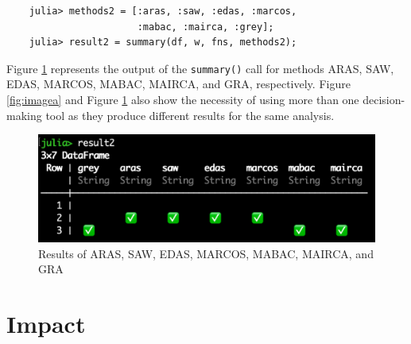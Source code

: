 \documentclass[preprint,review, 12pt, a4paper]{elsarticle}
\begin{document}
\begin{verbatim}
	julia> methods2 = [:aras, :saw, :edas, :marcos, 
	                   :mabac, :mairca, :grey];
	julia> result2 = summary(df, w, fns, methods2);
\end{verbatim}

Figure \ref{fig:imageb} represents the output of the \texttt{summary()} call for methods ARAS, SAW, EDAS, MARCOS, MABAC, MAIRCA, and GRA, respectively. Figure \ref{fig:imagea} and Figure \ref{fig:imageb} also show the necessity of using more than one decision-making tool as they produce different results for the same analysis.


	\begin{figure}
		\includegraphics[width=\columnwidth]{images/result2}
		\caption{Results of ARAS, SAW, EDAS, MARCOS, MABAC, MAIRCA, and GRA}
		\label{fig:imageb}
		\end{figure}


\section{Impact}
\label{section:impact}
\end{document}
